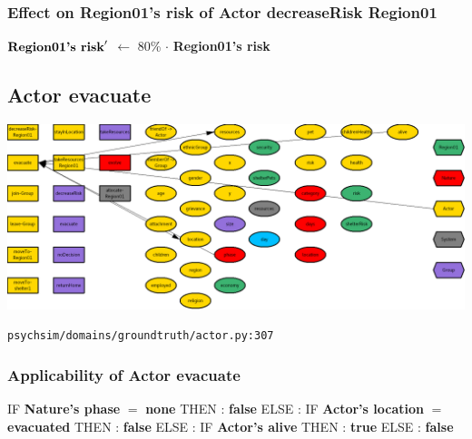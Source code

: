 \documentclass{article}%
\begin{document}
%
\subsubsection{Effect on Region01's risk of Actor decreaseRisk Region01}%
\label{ssubsec:Effect on Region01's risk of Actor decreaseRisk Region01}%
\begin{flushleft}%
$\mbox{\textbf{Region01's risk}} '$%
$\leftarrow$%
80\%%
$\cdot$%
\textbf{Region01's risk}%
\end{flushleft}

%
\subsection{Actor evacuate}%
\label{subsec:Actor evacuate}%
\includegraphics[width=\textwidth]{images/Actor-evacuate.png}%
\begin{flushleft}%
\verb|psychsim/domains/groundtruth/actor.py:307|%
\end{flushleft}%
\subsubsection{Applicability of Actor evacuate}%
\label{ssubsec:Applicability of Actor evacuate}%
\begin{flushleft}%
IF %
\textbf{Nature's phase}%
$=$%
\textbf{none}%
\linebreak%
\hspace*{2em}%
THEN %
: %
\textbf{false}%
\linebreak%
\hspace*{2em}%
ELSE %
: %
IF %
\textbf{Actor's location}%
$=$%
\textbf{evacuated}%
\linebreak%
\hspace*{4em}%
THEN %
: %
\textbf{false}%
\linebreak%
\hspace*{4em}%
ELSE %
: %
IF %
\textbf{Actor's alive}%
\linebreak%
\hspace*{6em}%
THEN %
: %
\textbf{true}%
\linebreak%
\hspace*{6em}%
ELSE %
: %
\textbf{false}%
\end{flushleft}
\end{document}
